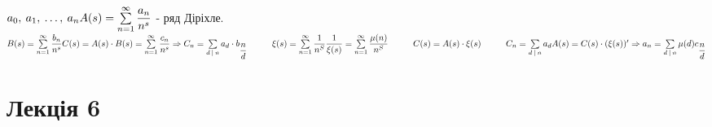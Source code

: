 \documentclass[a4paper,12pt, centered]{bookest}
\newcommand\tab[1][1cm]{\hspace*{#1}}
\begin{document}
\begin{example}
	$a_0,\>a_1,\>\dots,\>a_n\\ A(s)=\sum\limits_{n=1}^{\infty}\dfrac{a_n}{n^s}$ - ряд Діріхле.\tab $B(s)=\sum\limits_{n=1}^{\infty}\dfrac{b_n}{n^s}\\C(s)=A(s)\cdot B(s)=\sum\limits_{n=1}^{\infty}\dfrac{c_n}{n^s}\Rightarrow C_n=\sum\limits_{d\>|\>n}a_d\cdot b_{\dfrac nd}\tab\xi(s)=\sum\limits_{n=1}^{\infty}\dfrac1{n^S}\\ \dfrac1{\xi(s)}=\sum\limits_{n=1}^{\infty}\dfrac{\mu(n)}{n^S}\tab C(s)=A(s)\cdot\xi(s)\tab C_n=\sum\limits_{d\>|\>n	}a_d\\ A(s)=C(s)\cdot(\xi(s))'\Rightarrow a_n=\sum\limits_{d\>|\>n}\mu(d)c_{\dfrac nd}$
\end{example}
\let\cleardoublepage\clearpage
\chapter{Лекція 6}
\end{document}
